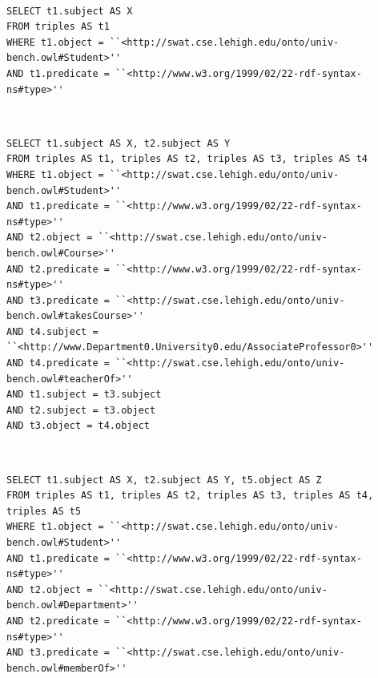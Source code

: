 \documentclass[10pt, a4paper]{report}
\begin{document}
\begin{enumerate}
\begin{minipage}{0.92\textwidth}
	\end{minipage} \\
	\begin{minipage}{0.92\textwidth}
		\item \label{query:lumb_sql_6}
		\lstset{language=sql}
		\begin{lstlisting}
SELECT t1.subject AS X
FROM triples AS t1
WHERE t1.object = ``<http://swat.cse.lehigh.edu/onto/univ-bench.owl#Student>''
AND t1.predicate = ``<http://www.w3.org/1999/02/22-rdf-syntax-ns#type>''
                        \end{lstlisting}
	\end{minipage} \\
	\begin{minipage}{0.92\textwidth}
		\item \label{query:lumb_sql_7}
		\lstset{language=sql}
		\begin{lstlisting}
SELECT t1.subject AS X, t2.subject AS Y
FROM triples AS t1, triples AS t2, triples AS t3, triples AS t4
WHERE t1.object = ``<http://swat.cse.lehigh.edu/onto/univ-bench.owl#Student>''
AND t1.predicate = ``<http://www.w3.org/1999/02/22-rdf-syntax-ns#type>''
AND t2.object = ``<http://swat.cse.lehigh.edu/onto/univ-bench.owl#Course>''
AND t2.predicate = ``<http://www.w3.org/1999/02/22-rdf-syntax-ns#type>''
AND t3.predicate = ``<http://swat.cse.lehigh.edu/onto/univ-bench.owl#takesCourse>''
AND t4.subject = ``<http://www.Department0.University0.edu/AssociateProfessor0>''
AND t4.predicate = ``<http://swat.cse.lehigh.edu/onto/univ-bench.owl#teacherOf>''
AND t1.subject = t3.subject
AND t2.subject = t3.object
AND t3.object = t4.object
                        \end{lstlisting}
	\end{minipage} \\
	\begin{minipage}{0.92\textwidth}
		\item \label{query:lumb_sql_8}
		\lstset{language=sql}
		\begin{lstlisting}
SELECT t1.subject AS X, t2.subject AS Y, t5.object AS Z
FROM triples AS t1, triples AS t2, triples AS t3, triples AS t4, triples AS t5
WHERE t1.object = ``<http://swat.cse.lehigh.edu/onto/univ-bench.owl#Student>''
AND t1.predicate = ``<http://www.w3.org/1999/02/22-rdf-syntax-ns#type>''
AND t2.object = ``<http://swat.cse.lehigh.edu/onto/univ-bench.owl#Department>''
AND t2.predicate = ``<http://www.w3.org/1999/02/22-rdf-syntax-ns#type>''
AND t3.predicate = ``<http://swat.cse.lehigh.edu/onto/univ-bench.owl#memberOf>''

\end{lstlisting}
\end{minipage}
\end{enumerate}
\end{document}
